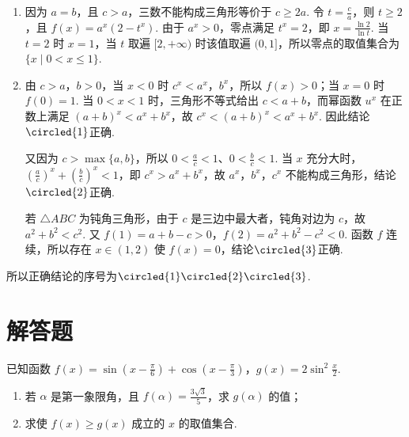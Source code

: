 \begin{solution}
\begin{enumerate}
\item 因为 \(a=b\)，且 \(c>a\)，三数不能构成三角形等价于 \(c\geqslant2a\). 令 \(t=\frac{c}{a}\)，则 \(t\geqslant2\)，且
\(f(x)=a^{x}(2-t^{x})\). 由于 \(a^{x}>0\)，零点满足 \(t^{x}=2\)，即 \(x=\frac{\ln2}{\ln t}\). 当 \(t=2\) 时 \(x=1\)，当 \(t\) 取遍 \([2,+\infty)\) 时该值取遍 \((0,1]\)，所以零点的取值集合为 \(\{x\mid0<x\leqslant1\}\).

\item 由 \(c>a\)，\(b>0\)，当 \(x<0\) 时 \(c^{x}<a^{x}\)，\(b^{x}\)，所以 \(f(x)>0\)；当 \(x=0\) 时 \(f(0)=1\). 当 \(0<x<1\) 时，三角形不等式给出 \(c<a+b\)，而幂函数 \(u^{x}\) 在正数上满足 \((a+b)^{x}<a^{x}+b^{x}\)，故 \(c^{x}<(a+b)^{x}<a^{x}+b^{x}\). 因此结论\(\circled{1}\)正确.

又因为 \(c>\max\{a,b\}\)，所以 \(0<\frac{a}{c}<1\)、\(0<\frac{b}{c}<1\). 当 \(x\) 充分大时，\(\left(\frac{a}{c}\right)^{x}+\left(\frac{b}{c}\right)^{x}<1\)，即 \(c^{x}>a^{x}+b^{x}\)，故 \(a^{x}\)，\(b^{x}\)，\(c^{x}\) 不能构成三角形，结论\(\circled{2}\)正确.

若 \(\triangle ABC\) 为钝角三角形，由于 \(c\) 是三边中最大者，钝角对边为 \(c\)，故 \(a^{2}+b^{2}<c^{2}\). 又 \(f(1)=a+b-c>0\)，\(f(2)=a^{2}+b^{2}-c^{2}<0\). 函数 \(f\) 连续，所以存在 \(x\in(1,2)\) 使 \(f(x)=0\)，结论\(\circled{3}\)正确.
\end{enumerate}
所以正确结论的序号为\(\circled{1}\circled{2}\circled{3}\).
\end{solution}

\section{解答题}

\begin{problem}
已知函数 \(f(x) = \sin \left(x - \frac{\pi}{6}\right) + \cos \left(x - \frac{\pi}{3}\right)\)，\(g(x) = 2\sin^2\frac{x}{2}\).
\begin{enumerate}
\item 若 \(\alpha\) 是第一象限角，且 \(f(\alpha) = \frac{3\sqrt{3}}{5}\)，求 \(g(\alpha)\) 的值；
\item 求使 \( f(x) \geqslant g(x) \) 成立的 \( x \) 的取值集合.
\end{enumerate}
\end{problem}

